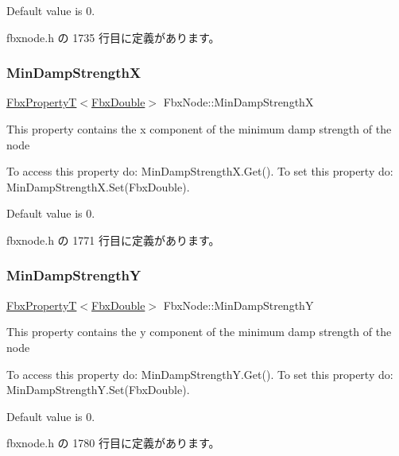 Default value is 0. 

 fbxnode.\+h の 1735 行目に定義があります。

\mbox{\label{class_fbx_node_ad3a1c278541e69133e0b1f3c25b98dfe}} 
\subsubsection{\texorpdfstring{Min\+Damp\+StrengthX}{MinDampStrengthX}}
{\footnotesize\ttfamily \hyperlink{class_fbx_property_t}{Fbx\+PropertyT}$<$\hyperlink{fbxtypes_8h_a171e72a1c46fc15c1a6c9c31948c1c5b}{Fbx\+Double}$>$ Fbx\+Node\+::\+Min\+Damp\+StrengthX}

This property contains the x component of the minimum damp strength of the node

To access this property do\+: Min\+Damp\+Strength\+X.\+Get(). To set this property do\+: Min\+Damp\+Strength\+X.\+Set(\+Fbx\+Double).

Default value is 0. 

 fbxnode.\+h の 1771 行目に定義があります。

\mbox{\label{class_fbx_node_ae3a54daa1551f3f33fa5d290074401fe}} 
\subsubsection{\texorpdfstring{Min\+Damp\+StrengthY}{MinDampStrengthY}}
{\footnotesize\ttfamily \hyperlink{class_fbx_property_t}{Fbx\+PropertyT}$<$\hyperlink{fbxtypes_8h_a171e72a1c46fc15c1a6c9c31948c1c5b}{Fbx\+Double}$>$ Fbx\+Node\+::\+Min\+Damp\+StrengthY}

This property contains the y component of the minimum damp strength of the node

To access this property do\+: Min\+Damp\+Strength\+Y.\+Get(). To set this property do\+: Min\+Damp\+Strength\+Y.\+Set(\+Fbx\+Double).

Default value is 0. 

 fbxnode.\+h の 1780 行目に定義があります。

\mbox{\label{class_fbx_node_a7d688b80e5b21f36250ec63a39b071c4}} 
